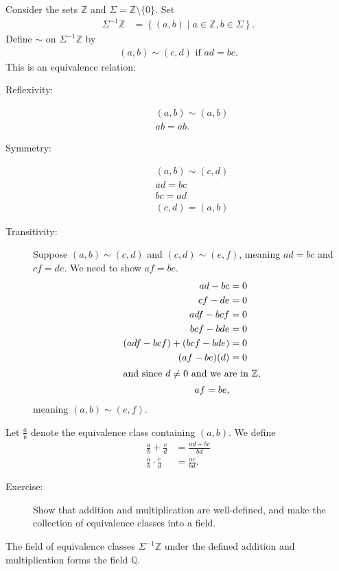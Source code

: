\documentclass[8pt]{extarticle}
\newcommand{\Q}{\mathbb{Q}}
\newcommand{\Z}{\mathbb{Z}}
\begin{document}
  Consider the sets $\Z$ and $\Sigma = \Z\setminus \{0\}$. Set
  \begin{align*}
   \Sigma^{-1}\Z &= \left\{(a,b)\mid a\in\Z,b\in\Sigma\right\}.
  \end{align*}
  Define $\sim$ on $\Sigma^{-1}\Z$ by
  \begin{align*}
   (a,b)\sim (c,d) \text{ if } ad = bc.
  \end{align*}
  This is an equivalence relation:
  \begin{description}
   \item[Reflexivity:] 
     \begin{align*}
       (a,b)\sim (a,b)\\
       ab = ab.
     \end{align*}
   \item[Symmetry:] 
     \begin{align*}
       (a,b)\sim (c,d)\\
       ad = bc\\
       bc = ad\\
       (c,d) = (a,b)
     \end{align*}
   \item[Transitivity:] Suppose $(a,b)\sim (c,d)$ and $(c,d)\sim (e,f)$, meaning $ad = bc$ and $cf = de$. We need to show $af = be$.
     \begin{align*}
       ad - bc &= 0\\
       cf - de &= 0\\
       adf - bcf &= 0\\
       bcf - bde &= 0\\
       (adf - bcf) + (bcf - bde) &= 0\\
       (af-be)(d) &= 0\\
       \intertext{and since $d\neq 0$ and we are in $\Z$,}
       af = be,
     \end{align*}
     meaning $(a,b)\sim (e,f)$.
  \end{description}
  Let $\frac{a}{b}$ denote the equivalence class containing $(a,b)$. We define
  \begin{align*}
   \frac{a}{b} + \frac{c}{d} &= \frac{ad + bc}{bd}\\
   \frac{a}{b}\cdot \frac{c}{d} &= \frac{ac}{bd}.
  \end{align*}
  \begin{description}
   \item[Exercise:] Show that addition and multiplication are well-defined, and make the collection of equivalence classes into a field.
  \end{description}
  The field of equivalence classes $\Sigma^{-1}\Z$ under the defined addition and multiplication forms the field $\Q$.\\
\end{document}
